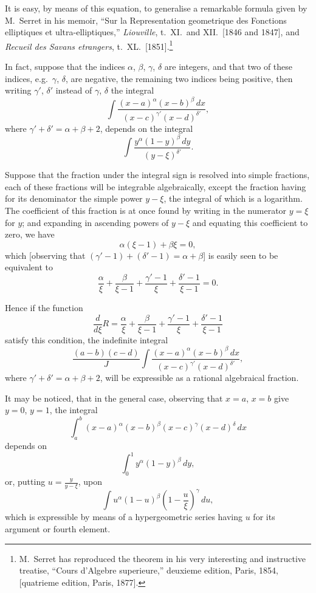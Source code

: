 \documentclass[11pt,a4paper]{book}
\begin{document}
It is easy, by means of this equation, to generalise a remarkable formula given by M.~Serret in his memoir, ``Sur la Representation geometrique des Fonctions elliptiques et ultra-elliptiques,'' \textit{Liouville}, t.~XI.\ and XII.\ [1846 and 1847], and \textit{Recueil des Savans etrangers}, t.~XL.\ [1851].\footnote{M.~Serret has reproduced the theorem in his very interesting and instructive treatise, ``Cours d'Algebre superieure,'' deuxieme edition, Paris, 1854, [quatrieme edition, Paris, 1877].}

In fact, suppose that the indices $\alpha$, $\beta$, $\gamma$, $\delta$ are integers, and that two of these indices, e.g.\ $\gamma$, $\delta$, are negative, the remaining two indices being positive, then writing $\gamma'$, $\delta'$ instead of $\gamma$, $\delta$ the integral
\[
\int \frac{(x-a)^\alpha (x-b)^\beta \, dx}{(x-c)^{\gamma'} (x-d)^{\delta'}},
\]
where $\gamma' + \delta' = \alpha + \beta + 2$, depends on the integral
\[
\int \frac{y^\alpha (1-y)^\beta \, dy}{(y-\xi)^{\delta'}}.
\]

Suppose that the fraction under the integral sign is resolved into simple fractions, each of these fractions will be integrable algebraically, except the fraction having for its denominator the simple power $y-\xi$, the integral of which is a logarithm. The coefficient of this fraction is at once found by writing in the numerator $y = \xi$ for $y$; and expanding in ascending powers of $y-\xi$ and equating this coefficient to zero, we have
\[
\alpha(\xi-1) + \beta\xi = 0,
\]
which [observing that $(\gamma'-1) + (\delta'-1) = \alpha + \beta$] is easily seen to be equivalent to
\[
\frac{\alpha}{\xi} + \frac{\beta}{\xi-1} + \frac{\gamma'-1}{\xi} + \frac{\delta'-1}{\xi-1} = 0.
\]

Hence if the function
\[
\frac{d}{d\xi} R = \frac{\alpha}{\xi} + \frac{\beta}{\xi-1} + \frac{\gamma'-1}{\xi} + \frac{\delta'-1}{\xi-1}
\]
satisfy this condition, the indefinite integral
\[
\frac{(a-b)(c-d)}{J} \int \frac{(x-a)^\alpha (x-b)^\beta \, dx}{(x-c)^{\gamma'} (x-d)^{\delta'}},
\]
where $\gamma' + \delta' = \alpha + \beta + 2$, will be expressible as a rational algebraical fraction.

It may be noticed, that in the general case, observing that $x=a$, $x=b$ give $y=0$, $y=1$, the integral
\[
\int_a^b (x-a)^\alpha (x-b)^\beta (x-c)^\gamma (x-d)^\delta \, dx
\]
depends on
\[
\int_0^1 y^\alpha (1-y)^\beta \, dy,
\]
or, putting $u = \frac{y}{y-\xi}$, upon
\[
\int u^\alpha (1-u)^\beta \left(1 - \frac{u}{\xi}\right)^\gamma \, du,
\]
which is expressible by means of a hypergeometric series having $u$ for its argument or fourth element.
\end{document}
